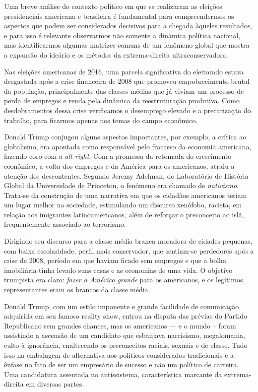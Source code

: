 Uma breve análise do contexto político em que se realizaram as eleições
presidenciais americana e brasileira é fundamental para compreendermos
os aspectos que podem ser considerados decisivos para a chegada àqueles
resultados, e para isso é relevante observarmos não somente a dinâmica
política nacional, mas identificarmos algumas matrizes comuns de um
fenômeno global que mostra a expansão do ideário e os métodos da extrema-direita ultraconservadora.

Nas eleições americanas de 2016, uma parcela significativa do eleitorado
estava desgastada após a crise financeira de 2008 que promoveu
empobrecimento brutal da população, principalmente das classes médias
que já viviam um processo de perda de empregos e renda pela dinâmica da
reestruturação produtiva. Como desdobramentos dessa crise verificamos o
desemprego elevado e a precarização do trabalho, para ficarmos apenas nos
temas do campo econômico.

Donald Trump conjugou alguns aspectos importantes, por exemplo, a
crítica ao globalismo, era apontada como responsável pelo fracasso da
economia americana, fazendo coro com a \textit{alt-right}. Com a promessa da
retomada do crescimento econômico, a volta dos empregos e da América
para os americanos, atraiu a atenção dos descontentes. Segundo Jeremy
Adelman, do Laboratório de História Global da Universidade de Princeton,
o fenômeno era chamado de \textit{nativismo}. Trata-se da construção de uma
narrativa em que os cidadãos americanos teriam um lugar melhor na
sociedade, estimulando um discurso xenófobo, racista, em relação aos
imigrantes latinoamericanos, além de reforçar o preconceito ao islã,
frequentemente associado ao terrorismo.

Dirigindo seu discurso para a classe média branca moradora de cidades
pequenas, com baixa escolaridade, perfil mais conservador, que sentiam-se
perdedores após a crise de 2008, período em que haviam ficado sem
empregos e que a bolha imobiliária tinha levado suas casas e as
economias de uma vida. O objetivo trumpista era claro: \textit{fazer a América
grande} para os americanos, e os legítimos representantes eram os brancos
da classe média.

Donald Trump, com um estilo imponente e grande facilidade de comunicação
adquirida em seu famoso reality show, entrou na disputa das prévias do
Partido Republicano sem grandes chances, mas os americanos --- e o mundo
-- foram assistindo a ascensão de um candidato que esbanjava narcisismo,
megalomania, culto à ignorância, enaltecendo os preconceitos raciais,
sexuais e de classe. Tudo isso na embalagem de alternativa aos políticos
considerados tradicionais e a ênfase no fato de ser um empresário de
sucesso e não um político de carreira. Uma candidatura assentada no
antissistema, característica marcante da extrema-direita em diversas
partes.

